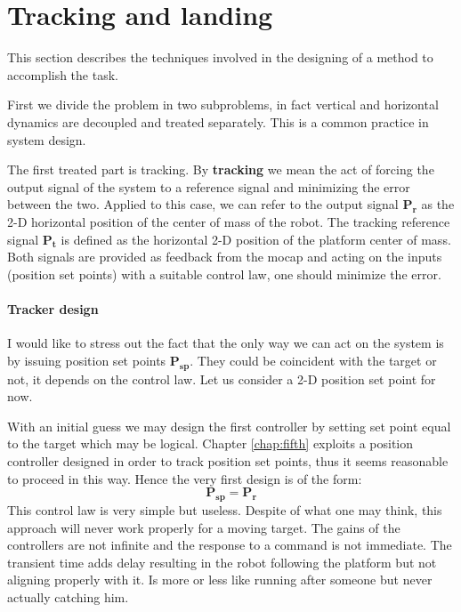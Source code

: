 \section{Tracking and landing}
This section describes the techniques involved in the designing of a method to accomplish the task.

First we divide the problem in two subproblems, in fact vertical and horizontal dynamics are decoupled and treated separately. This is a common practice in system design. 

The first treated part is tracking. By \textbf{tracking} we mean the act of forcing the output signal of the system to a reference signal and minimizing the error between the two. Applied to this case, we can refer to the output signal $\boldsymbol{P_r}$ as the 2-D horizontal position of the center of mass of the robot. The tracking reference signal 
$\boldsymbol{P_t}$ is defined as the horizontal 2-D position  of the platform center of mass. Both signals are provided as feedback from the mocap and acting on the inputs (position set points) with a suitable control law, one should minimize the error.

\paragraph{Tracker design} I would like to stress out the fact that the only way we can act on the system is by issuing position set points $\boldsymbol{P_{sp}}$. They could be coincident with the target or not, it depends on the control law. Let us consider a 2-D position set point for now.

With an initial guess we may design the first controller by setting set point equal to the target which may be logical. Chapter \ref{chap:fifth} exploits a position controller designed in order to track position set points, thus it seems reasonable to proceed in this way. Hence the very first design is of the form:
\begin{equation}
\boldsymbol{P_{sp }} = \boldsymbol{P_{r}}
\label{eq:contr1}
\end{equation}
This control law is very simple but useless. Despite of what one may think, this approach will never work properly for a moving target. The gains of the controllers are not infinite and the response to a command is not immediate. The transient time adds delay resulting in the robot following the platform but not aligning properly with it. Is more or less like running after someone but never actually catching him.


